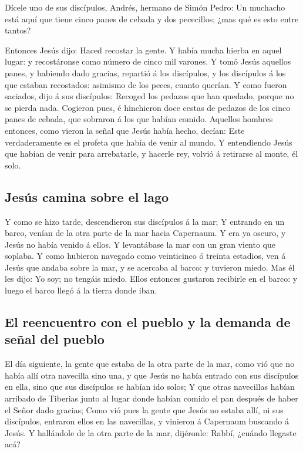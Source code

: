  Dícele uno de sus discípulos, Andrés, hermano de Simón
Pedro:  Un muchacho está aquí que tiene cinco panes de
cebada y dos pececillos; ¿mas qué es esto entre tantos?

 Entonces Jesús dijo: Haced recostar la gente. Y había
mucha hierba en aquel lugar: y recostáronse como número de cinco mil
varones.  Y tomó Jesús aquellos panes, y habiendo dado
gracias, repartió á los discípulos, y los discípulos á los que estaban
recostados: asimismo de los peces, cuanto querían.  Y
como fueron saciados, dijo á sus discípulos: Recoged los pedazos que han
quedado, porque no se pierda nada.  Cogieron pues, é
hinchieron doce cestas de pedazos de los cinco panes de cebada, que
sobraron á los que habían comido.  Aquellos hombres
entonces, como vieron la señal que Jesús había hecho, decían: Este
verdaderamente es el profeta que había de venir al mundo.
 Y entendiendo Jesús que habían de venir para
arrebatarle, y hacerle rey, volvió á retirarse al monte, él solo.

\hypertarget{jesuxfas-camina-sobre-el-lago}{%
\subsection{Jesús camina sobre el
lago}\label{jesuxfas-camina-sobre-el-lago}}

 Y como se hizo tarde, descendieron sus discípulos á la
mar;  Y entrando en un barco, venían de la otra parte de
la mar hacia Capernaum. Y era ya oscuro, y Jesús no había venido á
ellos.  Y levantábase la mar con un gran viento que
soplaba.  Y como hubieron navegado como veinticinco ó
treinta estadios, ven á Jesús que andaba sobre la mar, y se acercaba al
barco: y tuvieron miedo.  Mas él les dijo: Yo soy; no
tengáis miedo.  Ellos entonces gustaron recibirle en el
barco: y luego el barco llegó á la tierra donde iban.

\hypertarget{el-reencuentro-con-el-pueblo-y-la-demanda-de-seuxf1al-del-pueblo}{%
\subsection{El reencuentro con el pueblo y la demanda de señal del
pueblo}\label{el-reencuentro-con-el-pueblo-y-la-demanda-de-seuxf1al-del-pueblo}}

 El día siguiente, la gente que estaba de la otra parte
de la mar, como vió que no había allí otra navecilla sino una, y que
Jesús no había entrado con sus discípulos en ella, sino que sus
discípulos se habían ido solos;  Y que otras navecillas
habían arribado de Tiberias junto al lugar donde habían comido el pan
después de haber el Señor dado gracias;  Como vió pues la
gente que Jesús no estaba allí, ni sus discípulos, entraron ellos en las
navecillas, y vinieron á Capernaum buscando á Jesús.  Y
hallándole de la otra parte de la mar, dijéronle: Rabbí, ¿cuándo
llegaste acá?

